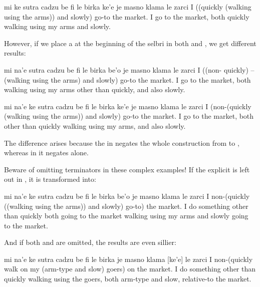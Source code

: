 \begin{example}
mi ke sutra cadzu be fi le birka  ke'e\n
\T	je masno klama le zarci\n
I ((quickly (walking using the arms))\n
\T	and slowly) go-to the market.\n
I go to the market, both quickly walking\n
\T	using my arms and slowly.
\end{example}

However, if we place a  at the beginning of the
    selbri in both  and , we get different results:
\begin{example}
mi na'e sutra cadzu be fi le birka be'o\n
\T	je masno klama le zarci\n
I ((non- quickly) -- (walking using the arms)\n
\T	and slowly) go-to the market.\n
I go to the market, both walking using my arms\n
\T	other than quickly, and also slowly.
\end{example}

\begin{example}
mi na'e ke sutra cadzu be fi le birka  ke'e\n
\T	je masno klama le zarci\n
I (non-(quickly (walking using the arms))\n
\T	and slowly) go-to the market.\n
I go to the market, both other than quickly\n
\T	walking using my arms, and also slowly.
\end{example}

The difference arises because the  in  negates the whole construction
    from  to , whereas in  it negates  alone.

Beware of omitting terminators in these complex examples! If
    the explicit  is left out in , it is transformed into:
\begin{example}
mi na'e ke sutra cadzu be fi le birka be'o\n
\T	je masno klama  le zarci\n
I non-(quickly ((walking using the arms))\n
\T	and slowly) go-to) the market.\n
I do something other than quickly both\n
\T	going to the market walking using my arms\n
\T	and slowly going to the market.
\end{example}

And if both  and  are omitted, the results
    are even sillier:
\begin{example}
mi na'e ke sutra cadzu be fi le birka\n
\T	je masno klama  [ke'e] le zarci\n
I non-(quickly walk on my (arm-type\n
\T	and slow) goers) on the market.\n
I do something other than quickly walking using the\n
\T	goers, both arm-type and slow, relative-to the market.
\end{example}

